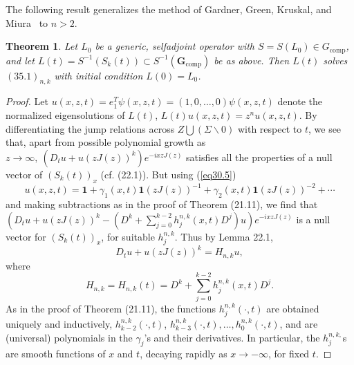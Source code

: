\documentclass{surv-l}
\theoremstyle{plain}
\newtheorem{theorem}{Theorem}[section]
\theoremstyle{definition}
\numberwithin{equation}{chapter}
\begin{document}
The following result generalizes the method of Gardner, Green, Kruskal, and Miura~\cite{GGKM} to $n>2$.
\setcounter{theorem}{18}
\begin{theorem}\label{thm35.19}
Let $L_{0}$ be a generic, selfadjoint operator with $S=S(L_{0})\in G_{\mathrm{comp}}$, and let $L(t)=S^{-1}(S_{k}(t))\subset S^{-1}(\mathbf{G}_{\mathrm{comp}})$ be as above. Then $L(t)$ solves $(35.1)_{n,k}$ with initial condition $L(0)=L_{0}$.
\end{theorem}
\begin{proof}
Let $u(x, z, t)=e_{1}^{T}\psi(x, z, t)=(1, 0,\ldots,0)\psi(x, z, t)$ denote the normalized eigensolutions of $L(t)$, $L(t)u(x, z, t)=z^{n}u(x, z, t)$. By differentiating the jump relations across $Z\bigcup(\Sigma\backslash 0)$ with respect to $t$, we see that, apart from possible polynomial growth as $ z\rightarrow\infty,\ (D_{t}u+u(zJ(z))^{k})e^{-ixzJ(z)}$ satisfies all the properties of a null vector of $(S_{k}(t))_{x}$ (cf. (22.1)). But using (\ref{eq30.5})
\begin{equation*}
u(x, z, t)=\mathbf{1}+\gamma_{1}(x, t)\mathbf{1}(zJ(z))^{-1}+\gamma_{2}(x, t)\mathbf{1}(zJ(z))^{-2}+\cdots
\end{equation*}
and making subtractions as in the proof of Theorem (21.11), we find that $(D_{t}u+u(zJ(z))^{k}-(D^{k}+\sum_{j=0}^{k-2}h_{j}^{n,k}(x, t)D^{j})u)e^{-ixzJ(z)}$ is a null vector for $(S_{k}(t))_{x}$, for suitable $h_{j}^{n,k}$. Thus by Lemma 22.1,
\setcounter{equation}{19}
\begin{equation}\label{eq35.20}
D_{t}u+u(zJ(z))^{k}=H_{n,k}u,
\end{equation}
where
\begin{equation}\label{eq35.21}
H_{n,k}=H_{n,k}(t)=D^{k}+\sum_{j=0}^{k-2}h_{j}^{n,k}(x, t)D^{j}.
\end{equation}
As in the proof of Theorem (21.11), the functions $h_{j}^{n,k}(\cdot,t)$ are obtained uniquely and inductively, $h_{k-2}^{n,k}(\cdot,t)$, $ h_{k-3}^{n,k}(\cdot, t),\ldots,h_{0}^{n,k}(\cdot, t)$, and are (universal) polynomials in the $\gamma_{j}$'s and their derivatives. In particular, the $h_{j}^{n,k,}$s are smooth functions of $x$ and $t$, decaying rapidly as $x\rightarrow-\infty$, for fixed $t$.


\end{proof}
\end{document}
